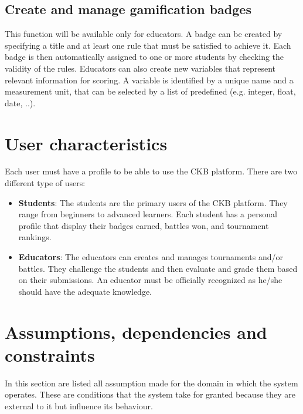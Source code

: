 \subsection{Create and manage gamification badges}
This function will be available only for educators. 
\newline A badge can be created by specifying a title and at least one rule that must be satisfied to achieve it. Each badge is then automatically assigned to one or more students by checking the validity of the rules. Educators can also create new variables that represent relevant information for scoring. A variable is identified by a unique name and a measurement unit, that can be selected by a list of predefined (e.g. integer, float, date, ..).

\section{User characteristics}
Each user must have a profile to be able to use the CKB platform.
There are two different type of users:
\begin{itemize}
	\item \textbf{Students}:
	    The students are the primary users of the CKB platform. They range from beginners to advanced learners. Each student has a personal profile that display their badges earned, battles won, and tournament rankings. 
	\item \textbf{Educators}: 
		The educators can creates and manages tournaments and/or battles. They challenge the students and then evaluate and grade them based on their submissions. An educator must be officially recognized as he/she should have the adequate knowledge.
\end{itemize}

\section{Assumptions, dependencies and constraints}
In this section are listed all assumption made for the domain in which the system operates. These are conditions that the system take for granted because they are external to it but influence its behaviour.

